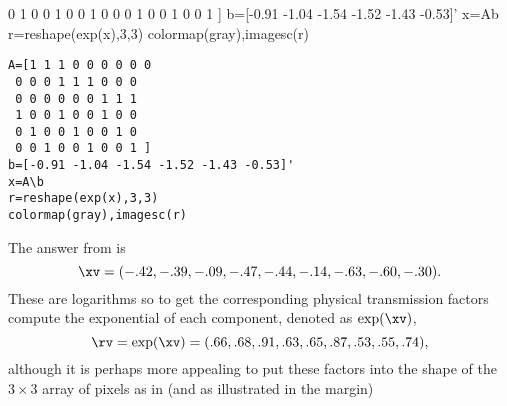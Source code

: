 \begin{example}
{{ 0 1 0 0 1 0 0 1 0 
 0 0 1 0 0 1 0 0 1 ]
b=[-0.91 -1.04 -1.54 -1.52 -1.43 -0.53]'
x=A\slosh b
r=reshape(exp(x),3,3)
colormap(gray),imagesc(r)
}}%
\marginpar{\usebox{\ajrqrbox\\[2ex]}}%
\begin{verbatim}
A=[1 1 1 0 0 0 0 0 0 
 0 0 0 1 1 1 0 0 0 
 0 0 0 0 0 0 1 1 1
 1 0 0 1 0 0 1 0 0 
 0 1 0 0 1 0 0 1 0 
 0 0 1 0 0 1 0 0 1 ]
b=[-0.91 -1.04 -1.54 -1.52 -1.43 -0.53]'
x=A\b
r=reshape(exp(x),3,3)
colormap(gray),imagesc(r)
\end{verbatim}
The answer from \script[2] is \twodp
\begin{equation*}
\xv=
(-.42,-.39,-.09,-.47,-.44,-.14,-.63,-.60,-.30).
\end{equation*}
These are logarithms so to get the corresponding physical transmission factors compute the exponential of each component, denoted as \(\exp(\xv)\),
\begin{equation*}
\rv=\exp(\xv)=(.66,.68,.91,.63,.65,.87,.53,.55,.74),
\end{equation*}
although it is perhaps more appealing to put these factors into the shape of the \(3\times3\) array of pixels as in (and as illustrated in the margin)
\def\temp#1#2#3#4#5#6#7#8#9{\begin{tikzpicture}
\begin{axis}[tiny,axis equal image,colormap/blackwhite,axis lines=none]
\addplot[patch,patch type=rectangle
,point meta min={0},point meta max={1}
,table/row sep=\\,patch table with point meta={%
8 9 13 12   #1\\
4 5 9 8     #2\\
0 1 5 4     #3\\
9 10 14 13  #4\\
5 6 10 9    #5\\
1 2 6 5     #6\\
10 11 15 14 #7\\
6 7 11 10   #8\\
2 3 7 6     #9\\
}]
table[row sep=\\] {
x y \\
0 0\\%
1 0\\%
2 0\\%
3 0\\%
0 1\\%
1 1\\%
2 1\\%
3 1\\%
}
\end{axis}
\end{tikzpicture}}
\end{example}
